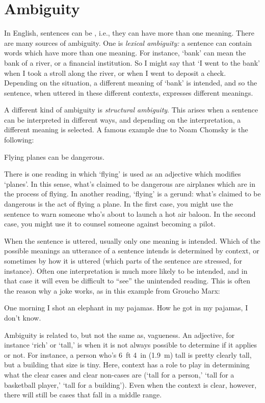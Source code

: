 \chapter{Ambiguity}\label{s:AbmbiguityTFL}

In English, sentences can be , i.e., they can have more than one meaning.  There are many sources of ambiguity. One is \emph{lexical ambiguity:} a sentence can contain words which have more than one meaning.  For instance, `bank' can mean the bank of a river, or a financial institution. So I might say that `I went to the bank' when I took a stroll along the river, or when I went to deposit a check.  Depending on the situation, a different meaning of `bank' is intended, and so the sentence, when uttered in these different contexts, expresses different meanings.

A different kind of ambiguity is \emph{structural ambiguity}.  This arises when a sentence can be interpreted in different ways, and depending on the interpretation, a different meaning is selected.  A famous example due to Noam Chomsky is the following:
\begin{earg}
	\prem Flying planes can be dangerous.
\end{earg}
There is one reading in which `flying' is used as an adjective which modifies `planes'. In this sense, what's claimed to be dangerous are airplanes which are in the process of flying.  In another reading, `flying' is a gerund: what's claimed to be dangerous is the act of flying a plane.  In the first case, you might use the sentence to warn someone who's about to launch a hot air baloon.  In the second case, you might use it to counsel someone against becoming a pilot.

When the sentence is uttered, usually only one meaning is intended. Which of the possible meanings an utterance of a sentence intends is determined by context, or sometimes by how it is uttered (which parts of the sentence are stressed, for instance). Often one interpretation is much more likely to be intended, and in that case it will even be difficult to ``see'' the unintended reading.  This is often the reason why a joke works, as in this example from Groucho Marx:
\begin{earg}
	\prem One morning I shot an elephant in my pajamas.
	\prem How he got in my pajamas, I don't know.
\end{earg}

Ambiguity is related to, but not the same as, vagueness. An adjective, for instance `rich' or `tall,' is  when it is not always possible to determine if it applies or not.  For instance, a person who's 6~ft 4~in (1.9~m) tall is pretty clearly tall, but a building that size is tiny.  Here, context has a role to play in determining what the clear cases and clear non-cases are (`tall for a person,' `tall for a basketball player,' `tall for a building'). Even when the context is clear, however, there will still be cases that fall in a middle range.

